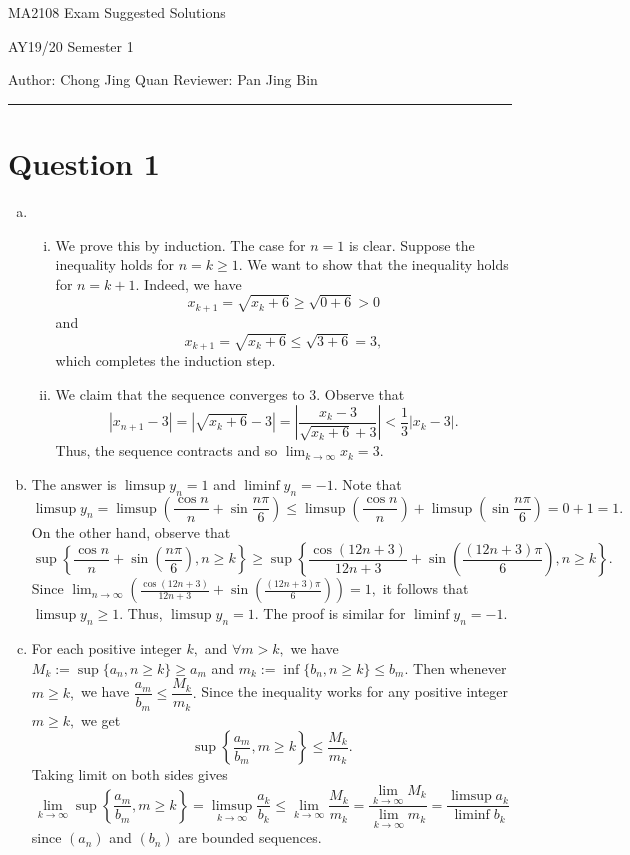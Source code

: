 \documentclass{article}
\begin{document}
    {\LARGE{MA2108 Exam Suggested Solutions}}
    
    {\large{AY19/20 Semester 1}}
    \vspace{0.2in}
    
    Author: Chong Jing Quan \hfill Reviewer: Pan Jing Bin
    
    \par\noindent\rule{\textwidth}{0.4pt}
\section*{Question 1}
\begin{enumerate}[(a)]
    \item \begin{enumerate}[(i)]
        \item We prove this by induction. The case for $n=1$ is clear. Suppose the inequality holds for $n=k\geq1.$ We want to show that the inequality holds for $n=k+1.$ Indeed, we have $$x_{k+1}=\sqrt{x_k+6}\geq\sqrt{0+6}>0$$ and $$x_{k+1}=\sqrt{x_k+6}\leq\sqrt{3+6}=3,$$ which completes the induction step.
        \item We claim that the sequence converges to 3. Observe that $$|x_{n+1}-3|=|\sqrt{x_k+6}-3|=\left|\frac{x_k-3}{\sqrt{x_k+6}+3}\right|<\frac{1}{3}|x_k-3|.$$ Thus, the sequence contracts and so $\displaystyle\lim_{k\to\infty}x_k=3.$
    \end{enumerate}
    \item The answer is $\limsup y_n=1$ and $\liminf y_n=-1.$ Note that
    $$\limsup y_n=\limsup \left(\frac{\cos n}{n}+\sin\frac{n\pi}{6}\right)\leq\limsup\left(\frac{\cos n}{n}\right)+\limsup\left(\sin\frac{n\pi}{6}\right)=0+1=1.$$
    On the other hand, observe that $$\sup\left\{\frac{\cos n}{n}+\sin\left(\frac{n\pi}{6}\right),n\geq k\right\}\geq \sup\left\{\frac{\cos(12n+3)}{12n+3}+\sin\left(\frac{(12n+3)\pi}{6}\right),n\geq k\right\}.$$
    Since $\displaystyle\lim_{n\to\infty}\left(\frac{\cos(12n+3)}{12n+3}+\sin\left(\frac{(12n+3)\pi}{6}\right)\right)=1,$ it follows that $\limsup y_n\geq1.$ Thus, $\limsup y_n=1.$ The proof is similar for $\liminf y_n=-1.$
    \item For each positive integer $k,$ and $\forall m > k,$ we have $M_k:=\sup \{a_n, n\geq k\}\geq a_m$ and $m_k:=\inf \{b_n, n\geq k\}\leq b_m$. Then whenever $m\geq k,$ we have $\dfrac{a_m}{b_m}\leq \dfrac{M_k}{m_k}.$ Since the inequality works for any positive integer $m\geq k,$ we get $$\sup\left\{\dfrac{a_m}{b_m},m\geq k\right\}\leq \dfrac{M_k}{m_k}.$$ Taking limit on both sides gives $$\lim_{k\to\infty}\sup\left\{\dfrac{a_m}{b_m},m\geq k\right\}=\limsup_{k\to\infty}\frac{a_k}{b_k}\leq \lim_{k\to\infty}\dfrac{M_k}{m_k}=\dfrac{\lim_{k\to\infty}M_k}{\lim_{k\to\infty}m_k}=\frac{\limsup a_k}{\liminf b_k}$$ since $(a_n)$ and $(b_n)$ are bounded sequences.
\end{enumerate}
\end{document}
